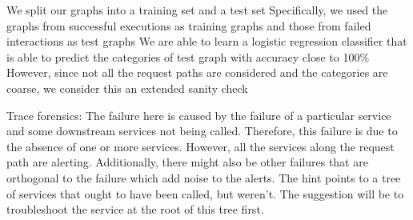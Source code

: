 We split our graphs into a training set and a test set
Specifically, we used the graphs from successful executions as training graphs and those from failed interactions as test graphs
We are able to learn a logistic regression classifier that is able to predict the categories of test graph with accuracy close to 100\%
However, since not all the request paths are considered and the categories are coarse, we consider this an extended sanity check

Trace forensics: \newline
The failure here is caused by the failure of a particular service and some downstream services not being called. 
Therefore, this failure is due to the absence of one or more services.
However, all the services along the request path are alerting.
Additionally, there might also be other failures that are orthogonal to the failure which add noise to the alerts.
The hint points to a tree of services that ought to have been called, but weren’t. The suggestion will be to troubleshoot the service at the root of this tree first.
